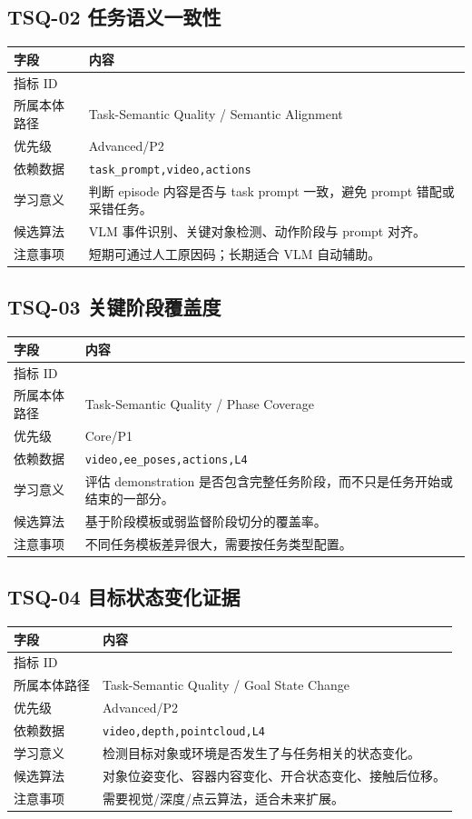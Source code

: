 \documentclass[UTF8,zihao=-4,oneside,openany]{ctexrep}
\newcommand{\Code}[1]{\texttt{#1}}
\newcommand{\MID}[1]{\texttt{\seqsplit{#1}}}
\begin{document}
\subsection{TSQ-02 任务语义一致性}

\begin{longtable}{L{3.6cm} L{9.6cm}}
\toprule
字段 & 内容 \\
\midrule
指标 ID & \MID{TSQ-02} \\
所属本体路径 & Task-Semantic Quality / Semantic Alignment \\
优先级 & Advanced/P2 \\
依赖数据 & \Code{task\_prompt,video,actions} \\
学习意义 & 判断 episode 内容是否与 task prompt 一致，避免 prompt 错配或采错任务。 \\
候选算法 & VLM 事件识别、关键对象检测、动作阶段与 prompt 对齐。 \\
注意事项 & 短期可通过人工原因码；长期适合 VLM 自动辅助。 \\
\bottomrule
\end{longtable}

\subsection{TSQ-03 关键阶段覆盖度}

\begin{longtable}{L{3.6cm} L{9.6cm}}
\toprule
字段 & 内容 \\
\midrule
指标 ID & \MID{TSQ-03} \\
所属本体路径 & Task-Semantic Quality / Phase Coverage \\
优先级 & Core/P1 \\
依赖数据 & \Code{video,ee\_poses,actions,L4} \\
学习意义 & 评估 demonstration 是否包含完整任务阶段，而不只是任务开始或结束的一部分。 \\
候选算法 & 基于阶段模板或弱监督阶段切分的覆盖率。 \\
注意事项 & 不同任务模板差异很大，需要按任务类型配置。 \\
\bottomrule
\end{longtable}

\subsection{TSQ-04 目标状态变化证据}

\begin{longtable}{L{3.6cm} L{9.6cm}}
\toprule
字段 & 内容 \\
\midrule
指标 ID & \MID{TSQ-04} \\
所属本体路径 & Task-Semantic Quality / Goal State Change \\
优先级 & Advanced/P2 \\
依赖数据 & \Code{video,depth,pointcloud,L4} \\
学习意义 & 检测目标对象或环境是否发生了与任务相关的状态变化。 \\
候选算法 & 对象位姿变化、容器内容变化、开合状态变化、接触后位移。 \\
注意事项 & 需要视觉/深度/点云算法，适合未来扩展。 \\
\bottomrule
\end{longtable}
\end{document}
